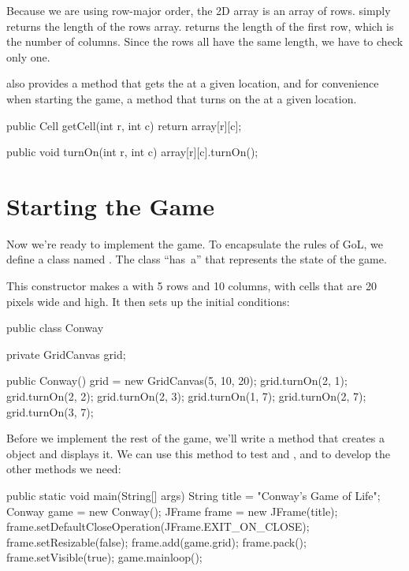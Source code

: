 Because we are using row-major order, the 2D array is an array of rows.
 simply returns the length of the rows array.
 returns the length of the first row, which is the number of columns.
Since the rows all have the same length, we have to check only one.

 also provides a method that gets the  at a given location, and for convenience when starting the game, a method that turns on the  at a given location.

\begin{code}
public Cell getCell(int r, int c) {
    return array[r][c];
}

public void turnOn(int r, int c) {
    array[r][c].turnOn();
}
\end{code}


\section{Starting the Game}
\label{conwaymain}

Now we're ready to implement the game.
To encapsulate the rules of GoL, we define a class named .
The  class ``has~a''  that represents the state of the game.

This constructor makes a  with 5 rows and 10 columns, with cells that are 20 pixels wide and high.
It then sets up the initial conditions:

\begin{code}
public class Conway {
    private GridCanvas grid;

    public Conway() {
        grid = new GridCanvas(5, 10, 20);
        grid.turnOn(2, 1);
        grid.turnOn(2, 2);
        grid.turnOn(2, 3);
        grid.turnOn(1, 7);
        grid.turnOn(2, 7);
        grid.turnOn(3, 7);
    }
}
\end{code}

Before we implement the rest of the game, we'll write a  method that creates a  object and displays it.
We can use this method to test  and , and to develop the other methods we need:

\begin{code}
public static void main(String[] args) {
    String title = "Conway's Game of Life";
    Conway game = new Conway();
    JFrame frame = new JFrame(title);
    frame.setDefaultCloseOperation(JFrame.EXIT_ON_CLOSE);
    frame.setResizable(false);
    frame.add(game.grid);
    frame.pack();
    frame.setVisible(true);
    game.mainloop();
}
\end{code}


